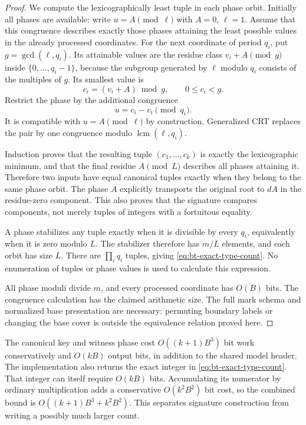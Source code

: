 \documentclass[11pt]{article}
\theoremstyle{definition}
\theoremstyle{remark}
\newcommand{\lcm}{\operatorname{lcm}}
\begin{document}
\begin{proof}
We compute the lexicographically least tuple in each phase orbit.  Initially
all phases are available: write $u=A\pmod\ell$ with $A=0$, $\ell=1$.
Assume that this congruence describes exactly those phases attaining the
least possible values in the already processed coordinates.  For the next
coordinate of period $q_i$, put $g=\gcd(\ell,q_i)$.  Its attainable values
are the residue class $v_i+A\pmod g$ inside $\{0,\ldots,q_i-1\}$, because
the subgroup generated by $\ell$ modulo $q_i$ consists of the multiples
of $g$.  Its smallest value is
\begin{equation}\label{eq:bt-greedy-coordinate}
 c_i=(v_i+A)\bmod g,\qquad 0\le c_i<g.
\end{equation}
Restrict the phase by the additional congruence
\[
 u=c_i-v_i\pmod{q_i}.
\]
It is compatible with $u=A\pmod\ell$ by construction.  Generalized CRT
replaces the pair by one congruence modulo $\lcm(\ell,q_i)$.

Induction proves that the resulting tuple $(c_1,\ldots,c_k)$ is exactly
the lexicographic minimum, and that the final residue $A\pmod L$
describes all phases attaining it.  Therefore two inputs have equal
canonical tuples exactly when they belong to the same phase orbit.
The phase $A$ explicitly transports the original root to $dA$ in the
residue-zero component.  This also proves that the signature compares
components, not merely tuples of integers with a fortuitous equality.

A phase stabilizes any tuple exactly when it is divisible by every
$q_i$, equivalently when it is zero modulo $L$.  The stabilizer therefore
has $m/L$ elements, and each orbit has size $L$.  There are
$\prod_iq_i$ tuples, giving \eqref{eq:bt-exact-type-count}.  No enumeration
of tuples or phase values is used to calculate this expression.

All phase moduli divide $m$, and every processed coordinate has $O(B)$
bits.  The congruence calculation has the claimed arithmetic size.
The full mark schema and normalized base presentation are necessary:
permuting boundary labels or changing the base cover is outside the
equivalence relation proved here.
\end{proof}

The canonical key and witness phase cost $O((k+1)B^3)$ bit work
conservatively and $O(kB)$ output bits, in addition to the shared model
header.  The implementation also returns the exact integer in
\eqref{eq:bt-exact-type-count}.  That integer can itself require
$O(kB)$ bits.  Accumulating its numerator by ordinary multiplication
adds a conservative $O(k^2B^2)$ bit cost, so the combined bound is
$O((k+1)B^3+k^2B^2)$.  This separates signature construction from writing
a possibly much larger count.
\end{document}
